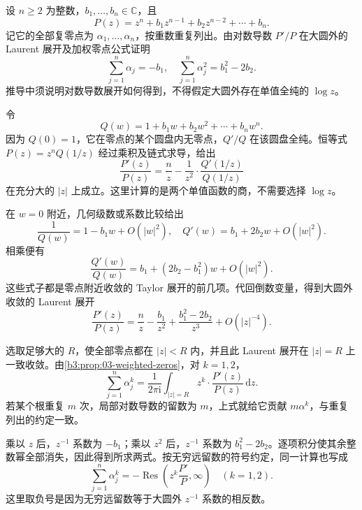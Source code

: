 \begin{exercise}\label{b3:ex:03-6}
设 \(n\ge2\) 为整数，\(b_1,\ldots,b_n\in\mathbb C\)，且
\[
  P(z)=z^n+b_1z^{n-1}+b_2z^{n-2}+\cdots+b_n.
\]
记它的全部复零点为 \(\alpha_1,\ldots,\alpha_n\)，按重数重复列出。由对数导数 \(P'/P\) 在大圆外的 Laurent 展开及加权零点公式证明
\[
  \sum_{j=1}^n\alpha_j=-b_1,
  \quad\sum_{j=1}^n\alpha_j^2=b_1^2-2b_2.
\]
推导中须说明对数导数展开如何得到，不得假定大圆外存在单值全纯的 \(\log z\)。
\end{exercise}
\begin{solution}
令
\[
  Q(w)=1+b_1w+b_2w^2+\cdots+b_nw^n.
\]
因为 \(Q(0)=1\)，它在零点的某个圆盘内无零点，\(Q'/Q\) 在该圆盘全纯。恒等式
\(P(z)=z^nQ(1/z)\) 经过乘积及链式求导，给出
\[
  \frac{P'(z)}{P(z)}
  =\frac nz-\frac1{z^2}\cdot\frac{Q'(1/z)}{Q(1/z)}
\]
在充分大的 \(|z|\) 上成立。这里计算的是两个单值函数的商，不需要选择 \(\log z\)。

在 \(w=0\) 附近，几何级数或系数比较给出
\[
  \frac1{Q(w)}=1-b_1w+O(|w|^2),
  \quad Q'(w)=b_1+2b_2w+O(|w|^2).
\]
相乘便有
\[
  \frac{Q'(w)}{Q(w)}
  =b_1+(2b_2-b_1^2)w+O(|w|^2).
\]
这些式子都是零点附近收敛的 Taylor 展开的前几项。代回倒数变量，得到大圆外收敛的 Laurent 展开
\[
  \frac{P'(z)}{P(z)}
  =\frac nz-\frac{b_1}{z^2}
   +\frac{b_1^2-2b_2}{z^3}+O(|z|^{-4}).
\]

选取足够大的 \(R\)，使全部零点都在 \(|z|<R\) 内，并且此 Laurent 展开在 \(|z|=R\) 上一致收敛。由\cref{b3:prop:03-weighted-zeros}，对 \(k=1,2\)，
\[
  \sum_{j=1}^n\alpha_j^k
  =\frac1{2\pi\mathrm{i}}\int_{|z|=R}
       z^k\cdot\frac{P'(z)}{P(z)}\,\mathrm{d}z.
\]
若某个根重复 \(m\) 次，局部对数导数的留数为 \(m\)，上式就给它贡献 \(m\alpha^k\)，与重复列出的约定一致。

乘以 \(z\) 后，\(z^{-1}\) 系数为 \(-b_1\)；乘以 \(z^2\) 后，\(z^{-1}\) 系数为 \(b_1^2-2b_2\)。逐项积分使其余整数幂全部消失，因此得到所求两式。按无穷远留数的符号约定，同一计算也写成
\[
  \sum_{j=1}^n\alpha_j^k
  =-\operatorname{Res}\left(z^k\frac{P'}P,\infty\right)
  \quad(k=1,2).
\]
这里取负号是因为无穷远留数等于大圆外 \(z^{-1}\) 系数的相反数。
\end{solution}

